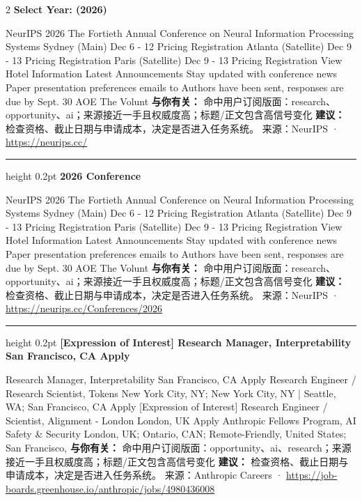 \documentclass[10.5pt]{ctexart}
\begin{document}
\begin{multicols}{2}
{\large\bfseries Select Year: (2026)}\par
NeurIPS 2026 The Fortieth Annual Conference on Neural Information Processing Systems Sydney (Main) Dec 6 - 12 Pricing Registration Atlanta (Satellite) Dec 9 - 13 Pricing Registration Paris (Satellite) Dec 9 - 13 Pricing Registration View Hotel Information Latest Announcements Stay updated with conference news Paper presentation preferences emails to Authors have been sent, responses are due by Sept. 30 AOE The Volunt
\textbf{与你有关：} 命中用户订阅版面：research、opportunity、ai；来源接近一手且权威度高；标题/正文包含高信号变化
\textbf{建议：} 检查资格、截止日期与申请成本，决定是否进入任务系统。
{\footnotesize\color{ormuted} 来源：NeurIPS · \url{https://neurips.cc/}}
\vspace{2mm}
\hrule height 0.2pt
\vspace{2mm}
{\large\bfseries 2026 Conference}\par
NeurIPS 2026 The Fortieth Annual Conference on Neural Information Processing Systems Sydney (Main) Dec 6 - 12 Pricing Registration Atlanta (Satellite) Dec 9 - 13 Pricing Registration Paris (Satellite) Dec 9 - 13 Pricing Registration View Hotel Information Latest Announcements Stay updated with conference news Paper presentation preferences emails to Authors have been sent, responses are due by Sept. 30 AOE The Volunt
\textbf{与你有关：} 命中用户订阅版面：research、opportunity、ai；来源接近一手且权威度高；标题/正文包含高信号变化
\textbf{建议：} 检查资格、截止日期与申请成本，决定是否进入任务系统。
{\footnotesize\color{ormuted} 来源：NeurIPS · \url{https://neurips.cc/Conferences/2026}}
\vspace{2mm}
\hrule height 0.2pt
\vspace{2mm}
{\large\bfseries [Expression of Interest] Research Manager, Interpretability San Francisco, CA Apply}\par
[Expression of Interest] Research Manager, Interpretability San Francisco, CA Apply Research Engineer / Research Scientist, Tokens New York City, NY; New York City, NY | Seattle, WA; San Francisco, CA Apply [Expression of Interest] Research Engineer / Scientist, Alignment - London London, UK Apply Anthropic Fellows Program, AI Safety \& Security London, UK; Ontario, CAN; Remote-Friendly, United States; San Francisco, 
\textbf{与你有关：} 命中用户订阅版面：opportunity、ai、research；来源接近一手且权威度高；标题/正文包含高信号变化
\textbf{建议：} 检查资格、截止日期与申请成本，决定是否进入任务系统。
{\footnotesize\color{ormuted} 来源：Anthropic Careers · \url{https://job-boards.greenhouse.io/anthropic/jobs/4980436008}}

\end{multicols}
\end{document}
